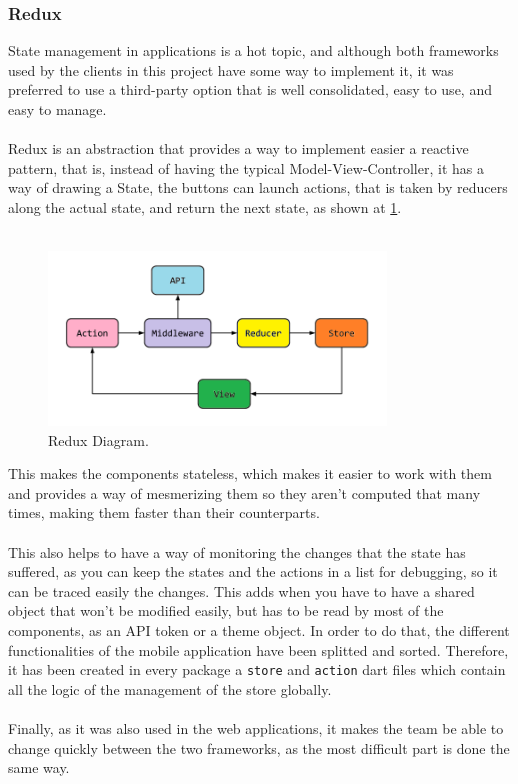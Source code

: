 \documentclass[./main.tex]{subfiles}
\begin{document}
	\subsubsection{Redux}\label{sec:redux>}
	State management in applications is a hot topic, and although both frameworks used by the clients in this project have some way to implement it, it was preferred to use a third-party option that is well consolidated, easy to use, and easy to manage.\\
	\\
	Redux is an abstraction that provides a way to implement easier a reactive pattern, that is, instead of having the typical Model-View-Controller, it has a way of drawing a State, the buttons can launch actions, that is taken by reducers along the actual state, and return the
	next state, as shown at \ref{fig:redux}.\\
	\\
	\begin{figure}[H]
		\centering
		\includegraphics[width=0.8\textwidth]{img/redux.png}
		\caption{Redux Diagram.}
		\label{fig:redux}
	\end{figure}
	This makes the components stateless, which makes it easier to work with them and provides a way of mesmerizing them so they aren't computed that many times, making them faster than their counterparts. 
	\\
	\\
	This also helps to have a way of monitoring the changes that the state has suffered, as you can keep the states and the actions in a list for debugging, so it can be traced easily the changes. This adds when you have to have a shared object that won't be modified easily, but has to be read by most of the components, as an API token or a theme object. In order to do that, the different functionalities of the mobile application have been splitted and sorted. Therefore, it has been created in every package a \texttt{store} and \texttt{action} dart files which contain all the logic of the management of the store globally.
	\\
	\\
	Finally, as it was also used in the web applications, it makes the team be able to change quickly between the two frameworks, as the most difficult part is done the same way.
\end{document}
